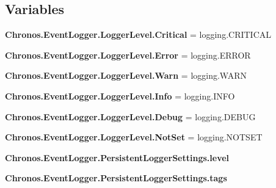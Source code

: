 \subsection*{Variables}
\begin{DoxyCompactItemize}
\item 
{\bfseries Chronos.\+Event\+Logger.\+Logger\+Level.\+Critical} = logging.\+C\+R\+I\+T\+I\+C\+AL\hypertarget{group__PyInfrastructure_gae6d569d81b279e6ac6cec54b602b5e0d}{}\label{group__PyInfrastructure_gae6d569d81b279e6ac6cec54b602b5e0d}

\item 
{\bfseries Chronos.\+Event\+Logger.\+Logger\+Level.\+Error} = logging.\+E\+R\+R\+OR\hypertarget{group__PyInfrastructure_ga8151d2472b98c9f17354e83cb825aad2}{}\label{group__PyInfrastructure_ga8151d2472b98c9f17354e83cb825aad2}

\item 
{\bfseries Chronos.\+Event\+Logger.\+Logger\+Level.\+Warn} = logging.\+W\+A\+RN\hypertarget{group__PyInfrastructure_ga5695cfcf2f86c985a4cfb3936137bbac}{}\label{group__PyInfrastructure_ga5695cfcf2f86c985a4cfb3936137bbac}

\item 
{\bfseries Chronos.\+Event\+Logger.\+Logger\+Level.\+Info} = logging.\+I\+N\+FO\hypertarget{group__PyInfrastructure_ga09d7204f03066311de1218a1755baf53}{}\label{group__PyInfrastructure_ga09d7204f03066311de1218a1755baf53}

\item 
{\bfseries Chronos.\+Event\+Logger.\+Logger\+Level.\+Debug} = logging.\+D\+E\+B\+UG\hypertarget{group__PyInfrastructure_gabb563848ee0b3064c88f114a51cc8e4c}{}\label{group__PyInfrastructure_gabb563848ee0b3064c88f114a51cc8e4c}

\item 
{\bfseries Chronos.\+Event\+Logger.\+Logger\+Level.\+Not\+Set} = logging.\+N\+O\+T\+S\+ET\hypertarget{group__PyInfrastructure_gab2458ccae48db35c043500c9c1293d8d}{}\label{group__PyInfrastructure_gab2458ccae48db35c043500c9c1293d8d}

\item 
{\bfseries Chronos.\+Event\+Logger.\+Persistent\+Logger\+Settings.\+level}\hypertarget{group__PyInfrastructure_ga1dc41e4cb1448dfbb5a8127b718544e2}{}\label{group__PyInfrastructure_ga1dc41e4cb1448dfbb5a8127b718544e2}

\item 
{\bfseries Chronos.\+Event\+Logger.\+Persistent\+Logger\+Settings.\+tags}\hypertarget{group__PyInfrastructure_gaee0adf657d8c09a565599d01fb6b3889}{}\label{group__PyInfrastructure_gaee0adf657d8c09a565599d01fb6b3889}


\end{DoxyCompactItemize}
